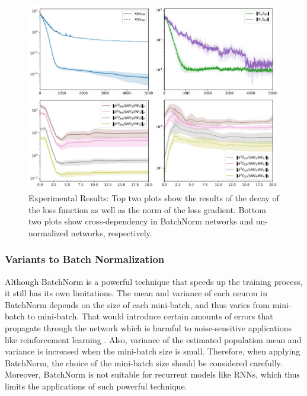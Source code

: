 \documentclass{article}
\begin{document}
\begin{figure}[h]
	\centering
    \includegraphics[scale=0.5]{pics/batchNorm/decoupling_experiment.jpg}
	\caption{Experimental Results: Top two plots show the results of the decay of the loss function as well as the norm of the loss gradient. Bottom two plots show cross-dependency in BatchNorm networks and un-normalized networks, respectively.}
	\label{fig:decouplingexperiment}
\end{figure}

\subsubsection{Variants to Batch Normalization}

\textbf{}

Although BatchNorm is a powerful technique that speeds up the training process, it still has its own limitations. The mean and variance of each neuron in BatchNorm depends on the size of each mini-batch, and thus varies from mini-batch to mini-batch. That would introduce certain amounts of errors that propagate through the network which is harmful to noise-sensitive applications like reinforcement learning \cite{reparameter}. Also, variance of the estimated population mean and variance is increased when the mini-batch size is small. Therefore, when applying BatchNorm, the choice of the mini-batch size should be considered carefully. Moreover, BatchNorm is not suitable for recurrent models like RNNs, which thus limits the applications of such powerful technique.

\textbf{}
\end{document}
